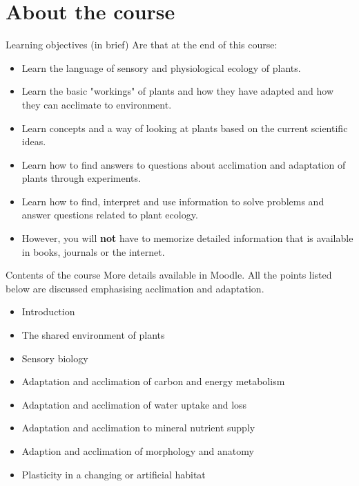 \documentclass[10pt]{beamer}
\begin{document}
\section{About the course}

\begin{frame}{Learning objectives (in brief)}
    Are that at the end of this course:
    \begin{itemize}
    \item Learn the language of sensory and physiological ecology of plants.
    \item Learn the basic "workings" of plants and how they have adapted and how they can acclimate to environment.
    \item Learn concepts and a way of looking at plants based on the current scientific ideas.
    \item Learn how to find answers to questions about acclimation and adaptation of plants through experiments.
    \item Learn how to find, interpret and use information to solve problems and answer questions related to plant ecology.
    \item However, you will \textbf{not} have to memorize detailed information that is available in books, journals or the internet.
    \end{itemize}
\end{frame}

\begin{frame}{Contents of the course}
More details available in Moodle. All the points listed below are discussed emphasising acclimation and adaptation.
\begin{itemize}
   \item Introduction
   \item The shared environment of plants
   \item Sensory biology
   \item Adaptation and acclimation of carbon and energy metabolism
   \item Adaptation and acclimation of water uptake and loss
   \item Adaptation and acclimation to mineral nutrient supply
   \item Adaption and acclimation of morphology and anatomy
   \item Plasticity in a changing or artificial habitat
\end{itemize}
\end{frame}
\end{document}
